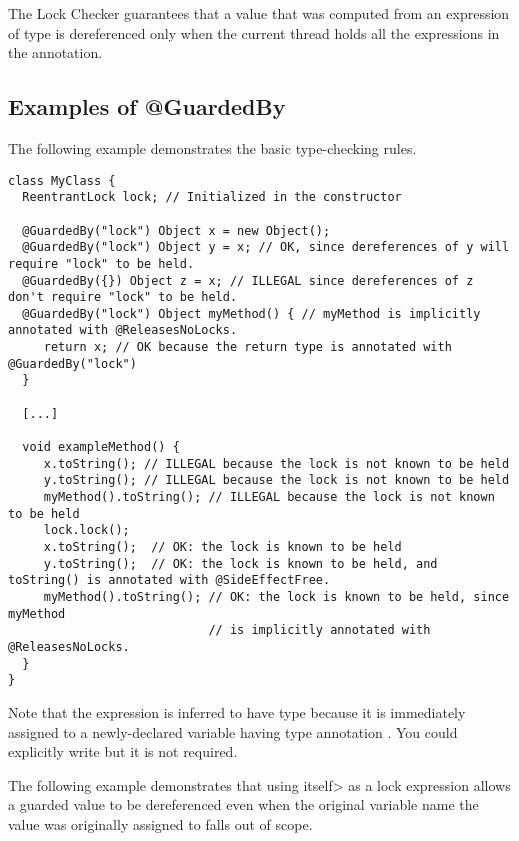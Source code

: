 The Lock Checker guarantees that a value that was computed from an expression of  type is
dereferenced only when the current thread holds all the expressions in the
 annotation.

\subsection{Examples of @GuardedBy\label{lock-examples-guardedby}}

The following example demonstrates the basic
type-checking rules.

\begin{Verbatim}
class MyClass {
  ReentrantLock lock; // Initialized in the constructor

  @GuardedBy("lock") Object x = new Object();
  @GuardedBy("lock") Object y = x; // OK, since dereferences of y will require "lock" to be held.
  @GuardedBy({}) Object z = x; // ILLEGAL since dereferences of z don't require "lock" to be held.
  @GuardedBy("lock") Object myMethod() { // myMethod is implicitly annotated with @ReleasesNoLocks.
     return x; // OK because the return type is annotated with @GuardedBy("lock")
  }

  [...]

  void exampleMethod() {
     x.toString(); // ILLEGAL because the lock is not known to be held
     y.toString(); // ILLEGAL because the lock is not known to be held
     myMethod().toString(); // ILLEGAL because the lock is not known to be held
     lock.lock();
     x.toString();  // OK: the lock is known to be held
     y.toString();  // OK: the lock is known to be held, and toString() is annotated with @SideEffectFree.
     myMethod().toString(); // OK: the lock is known to be held, since myMethod
                            // is implicitly annotated with @ReleasesNoLocks.
  }
}
\end{Verbatim}

Note that the expression  is inferred to have type 
because it is immediately assigned to a newly-declared
variable having type annotation .  You could
explicitly write  but it is not
required.

The following example demonstrates that using \<itself> as a lock expression
allows a guarded value to be dereferenced even when the original
variable name the value was originally assigned to falls out of scope.

